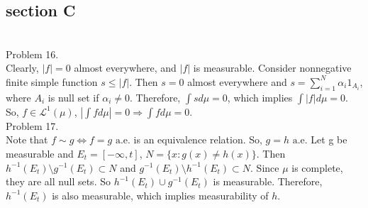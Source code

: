 \subsection*{section C} \hfill \\

Problem 16. \\

Clearly, $ \lvert f \rvert = 0$ almost everywhere, and $\lvert f \rvert$ is measurable.
Consider nonnegative finite simple function $s \leq \lvert f \rvert$. Then $s=0$ almost everywhere
and $s = \sum_{i=1}^N \alpha_i 1_{A_i}$, where $A_i$ is null set if $\alpha_i \ne 0$.
Therefore, $\int s d\mu = 0$, which implies $\int \lvert f \rvert d\mu = 0$.
So, $f \in \mathcal{L}^1(\mu)$, $\left | \int f d \mu \right | =0 \Rightarrow \int f d \mu = 0$.\\

Problem 17. \\

Note that $f \sim g \Leftrightarrow f = g\text{ a.e.}$ is an equivalence relation.
So, $g = h \text{ a.e}$.
Let g be measurable and $E_t = \left [ -\infty, t \right]$, $N = \{ x : g(x) \ne h(x)\}$.
Then $h^{-1}(E_t) \setminus g^{-1}(E_t) \subset N$ and $g^{-1}(E_t) \setminus h^{-1}(E_t) \subset N$.
Since $\mu$ is complete, they are all null sets. So $h^{-1}(E_t) \cup g^{-1}(E_t)$ is measurable.
Therefore, $h^{-1}(E_t)$ is also measurable, which implies measurability of $h$.\\
